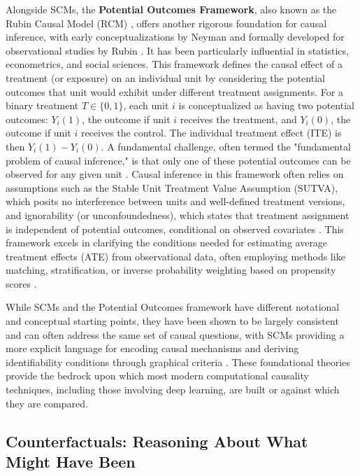 Alongside SCMs, the \textbf{Potential Outcomes Framework}, also known as the Rubin Causal Model (RCM) \cite{holland1986statistics}, offers another rigorous foundation for causal inference, with early conceptualizations by Neyman \cite{splawa1990application} and formally developed for observational studies by Rubin \cite{rubin1974estimating}. It has been particularly influential in statistics, econometrics, and social sciences. This framework defines the causal effect of a treatment (or exposure) on an individual unit by considering the potential outcomes that unit would exhibit under different treatment assignments. For a binary treatment $T \in \{0,1\}$, each unit $i$ is conceptualized as having two potential outcomes: $Y_i(1)$, the outcome if unit $i$ receives the treatment, and $Y_i(0)$, the outcome if unit $i$ receives the control. The individual treatment effect (ITE) is then $Y_i(1) - Y_i(0)$. A fundamental challenge, often termed the "fundamental problem of causal inference," is that only one of these potential outcomes can be observed for any given unit \cite{holland1986statistics}. Causal inference in this framework often relies on assumptions such as the Stable Unit Treatment Value Assumption (SUTVA), which posits no interference between units and well-defined treatment versions, and ignorability (or unconfoundedness), which states that treatment assignment is independent of potential outcomes, conditional on observed covariates \cite{rosenbaum1983central}. This framework excels in clarifying the conditions needed for estimating average treatment effects (ATE) from observational data, often employing methods like matching, stratification, or inverse probability weighting based on propensity scores \cite{rosenbaum1983central}.

While SCMs and the Potential Outcomes framework have different notational and conceptual starting points, they have been shown to be largely consistent and can often address the same set of causal questions, with SCMs providing a more explicit language for encoding causal mechanisms and deriving identifiability conditions through graphical criteria \cite{Pearl2009Causality}. These foundational theories provide the bedrock upon which most modern computational causality techniques, including those involving deep learning, are built or against which they are compared.

\subsection{Counterfactuals: Reasoning About What Might Have Been}
\label{subsec:counterfactuals}

